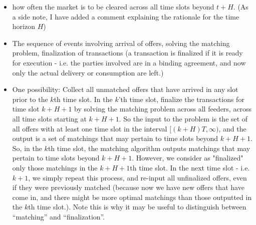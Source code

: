  \begin{itemize}
\item how often the market is to be cleared across all time slots beyond $t+H$. (As a side note, I have added a comment explaining the rationale for the time horizon $H$)
\item The sequence of events involving arrival of offers, solving the matching problem, finalization of transactions (a transaction is finalized if it is ready for execution - i.e. the parties involved are in a binding agreement, and now only the actual delivery or consumption are left.)
\item One possibility: Collect all unmatched offers that have arrived in any slot prior to the $k$th time slot. In the $k$'th time slot, finalize the transactions for time slot $k+H+1$ by solving the matching problem across all feeders, across all time slots starting at $k+H+1$. So the input to the problem is the set of all offers with at least one time slot in the interval $[(k+H)T,\infty)$, and the output is a set of matchings that may pertain to time slots beyond $k+H+1$. So, in the $k$th time slot, the matching algorithm outputs matchings that may pertain to time slots beyond $k+H+1$. However, we consider as "finalized" only those matchings in the $k+H+1$th time slot. In the next time slot - i.e. $k+1$, we simply repeat this process, and re-input all unfinalized offers, even if they were previously matched (because now we have new offers that have come in, and there might be more optimal matchings than those outputted in the $k$th time slot.). Note this is why it may be useful to distinguish between ``matching'' and ``finalization''.

\end{itemize}
